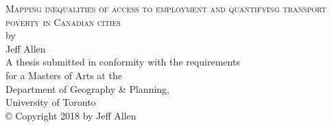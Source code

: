 \documentclass[11 pt, letterpaper]{article}
\begin{document}
	
{\begin{titlepage}
		\large
		\singlespacing
		\begin{center}
			\mbox{}
			\vfill
			\textsc{Mapping inequalities of access to employment and quantifying transport poverty in Canadian cities}\\
			\vfill
			by \\
			\vfill
			{Jeff Allen}\\
			\vfill
			\vfill
			A thesis submitted in conformity with the requirements\\
			for a Masters of Arts at the \\
			Department of Geography \& Planning,\\
			University of Toronto\\
			\vfill
			{\copyright} Copyright 2018 by Jeff Allen\\
			\vspace{.01\textheight}
			\mbox{}
		\end{center}
		\setcounter{page}{1}
	\end{titlepage}
	\setcounter{page}{2}}






\renewcommand{\thepage}{\roman{page}}%

\newpage
\end{document}
